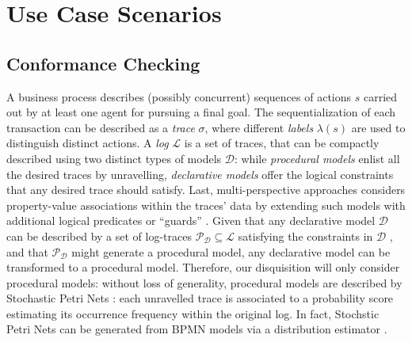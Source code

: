 \section{Use Case Scenarios}
\subsection{Conformance Checking}
A business process describes (possibly concurrent) sequences of actions $s$ carried out by at least one agent for pursuing a final goal. The sequentialization of each transaction can be described as a \textit{trace} $\sigma$, where different \textit{labels} $\lambda(s)$ are used to distinguish distinct actions. A \textit{log} $\mathcal{L}$ is a set of traces, that can be compactly described using two distinct types of models $\mathcal{D}$: while \textit{procedural models} \cite{DBLP:journals/tosem/PolyvyanyySWCM20} %
 enlist all the desired traces by unravelling,  \textit{declarative models} \cite{BurattinMAS12} offer the logical constraints that any desired trace should satisfy.  Last, multi-perspective approaches considers property-value associations within the traces' data by extending such models with additional logical predicates \cite{GiacomoMGMM14} or ``guards'' \cite{MannhardtLRA16}. Given that any declarative model $\mathcal{D}$ can be described by a set of log-traces $\mathcal{P}_\mathcal{D}\subseteq\mathcal{L}$ satisfying the constraints in $\mathcal{D}$ \cite{LeoniMA12}, and that $\mathcal{P}_\mathcal{D}$ might generate a procedural model, any declarative model can be transformed to a procedural model. Therefore, our disquisition will only consider procedural models: without loss of generality, procedural models are described by Stochastic Petri Nets \cite{MarsanCB84}: each unravelled trace is associated to a probability score estimating its occurrence frequency within the original log. In fact, Stochstic Petri Nets can be generated from BPMN models \cite{RaedtsPUWGS07} via a distribution estimator \cite{spdwe}. 

